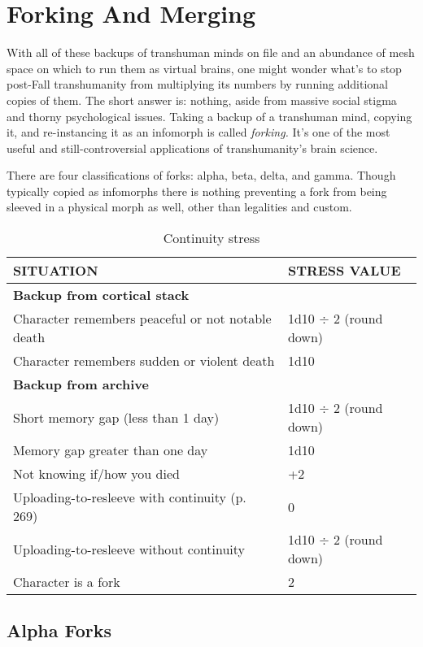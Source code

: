 \section{Forking And Merging}

With all of these backups of transhuman minds on 
file and an abundance of mesh space on which to run 
them as virtual brains, one might wonder what's to 
stop post-Fall transhumanity from multiplying its 
numbers by running additional copies of them. The 
short answer is: nothing, aside from massive social 
stigma and thorny psychological issues. Taking a 
backup of a transhuman mind, copying it, and re-instancing
it as an infomorph is called \textit{forking.} It's one
of the most useful and still-controversial applications 
of transhumanity's brain science.

There are four classifications of forks: alpha, beta, 
delta, and gamma. Though typically copied as infomorphs
there is nothing preventing a fork from being
sleeved in a physical morph as well, other than legalities
and custom.

\begin{table}
\caption{Continuity stress}
\begin{tabular}{|l|l|}
\hline
SITUATION & STRESS VALUE \\
\hline
\textbf{Backup from cortical stack} & \\
\hline
Character remembers peaceful or not notable death & 1d10 $\div$ 2 (round down) \\
\hline
Character remembers sudden or violent death & 1d10 \\
\hline
\textbf{Backup from archive} & \\
\hline
Short memory gap (less than 1 day) & 1d10 $\div$ 2 (round down) \\
\hline
Memory gap greater than one day & 1d10 \\
\hline
Not knowing if/how you died & +2 \\
\hline
Uploading-to-resleeve with continuity (p. 269) & 0 \\
\hline
Uploading-to-resleeve without continuity & 1d10 $\div$ 2 (round down) \\
\hline
Character is a fork & 2 \\
\hline
\end{tabular}
\label{table:continuity-stress}
\end{table}

\subsection{Alpha Forks}

